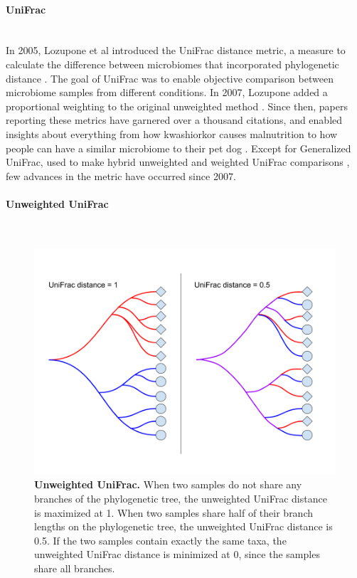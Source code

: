 \paragraph{UniFrac}\mbox{}\\
In 2005, Lozupone et al introduced the UniFrac distance metric, a measure to calculate the difference between microbiomes that incorporated phylogenetic distance \cite{lozupone2005unifrac}. The goal of UniFrac was to enable objective comparison between microbiome samples from different conditions. In 2007, Lozupone added a proportional weighting to the original unweighted method \cite{lozupone2007quantitative}. Since then, papers reporting these metrics have garnered over a thousand citations, and enabled insights about everything from how kwashiorkor causes malnutrition \cite{smith2013gut} to how people can have a similar microbiome to their pet dog \cite{song2013cohabiting}.  Except for Generalized UniFrac, used to make hybrid unweighted and weighted UniFrac comparisons \cite{chen2012associating}, few advances in the metric have occurred since 2007. 

\paragraph{Unweighted UniFrac}\mbox{}\\

\begin{figure}[h]
\begin{center}
\includegraphics[width=\textwidth]{unifrac.png}
\caption[Unweighted UniFrac.]{\textbf{Unweighted UniFrac.} When two samples do not share any branches of the phylogenetic tree, the unweighted UniFrac distance is maximized at 1. When two samples share half of their branch lengths on the phylogenetic tree, the unweighted UniFrac distance is 0.5. If the two samples contain exactly the same taxa, the unweighted UniFrac distance is minimized at 0, since the samples share all branches.}
\end{center}
\label{unweighted_unifrac}
\end{figure}

